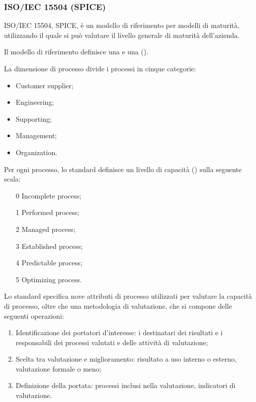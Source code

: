 \subsubsection{ISO/IEC 15504 (SPICE)}
\label{ssub:spice}

ISO/IEC 15504,  SPICE, è un modello di riferimento per modelli di
maturità, utilizzando il quale si può valutare il livello generale di maturità
dell'azienda.

Il modello di riferimento definisce una  e una
 ().

La dimensione di processo divide i processi in cinque categorie:

\begin{itemize}
  \item Customer supplier;
  \item Engineering;
  \item Supporting;
  \item Management;
  \item Organization.
\end{itemize}

Per ogni processo, lo standard definisce un livello di capacità
() sulla seguente scala:

\begin{enumerate}
  \item[0] Incomplete process;
  \item[1] Performed process;
  \item[2] Managed process;
  \item[3] Established process;
  \item[4] Predictable process;
  \item[5] Optimizing process.
\end{enumerate}

Lo standard specifica nove attributi di processo utilizzati per valutare la
capacità di processo, oltre che una metodologia di valutazione, che si compone
delle seguenti operazioni:

\begin{enumerate}
  \item Identificazione dei portatori d'interesse: i destinatari dei
    risultati e i responsabili dei processi valutati e delle attività di
    valutazione;
  \item Scelta tra valutazione e miglioramento: risultato a uso interno o
    esterno, valutazione formale o meno;
  \item Definizione della portata: processi inclusi nella valutazione,
    indicatori di valutazione.
\end{enumerate}
